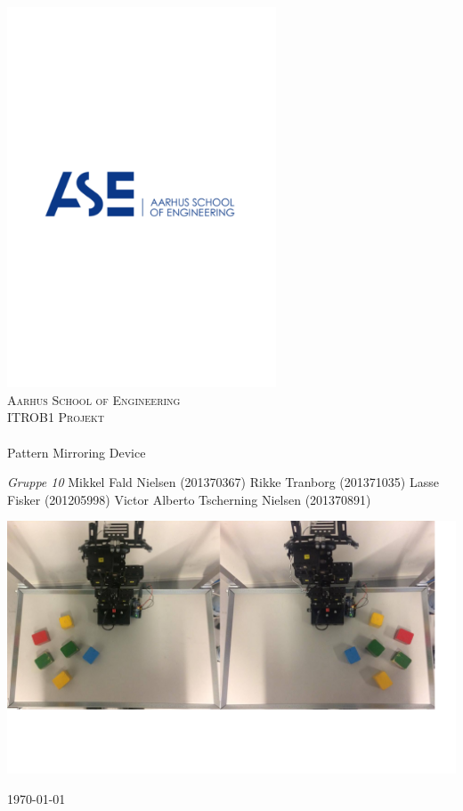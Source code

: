\begin{titlingpage}
\begin{center}

~ \\[1cm]

\includegraphics[width=0.6\textwidth]{figurer/ASE}~\\[1cm]

\textsc{\LARGE Aarhus School of Engineering}\\[1.5cm]

\textsc{\Large ITROB1 Projekt}\\

\noindent\makebox[\linewidth]{\rule{\textwidth}{0.4pt}}\\
[0.5cm]{\Huge Pattern Mirroring Device}
\noindent\makebox[\linewidth]{\rule{\textwidth}{0.4pt}}

\end{center}

\textit{Gruppe 10} \newline
Mikkel Fald Nielsen (201370367) \newline
Rikke Tranborg (201371035)\newline 
Lasse Fisker (201205998) \newline
Victor Alberto Tscherning Nielsen (201370891) \newline		 
\begin{center}
    \includegraphics[width=\textwidth]{figurer/ForsideBillede}
  \end{center}

\begin{center}
{\large \today}
\end{center}

\end{titlingpage}